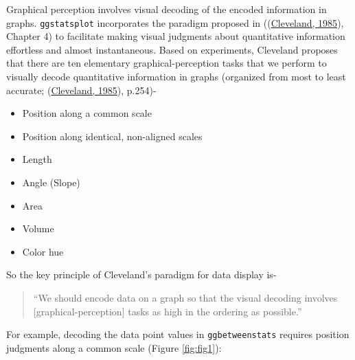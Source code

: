 \documentclass[
]{article}
\providecommand{\tightlist}{%
  \setlength{\itemsep}{0pt}\setlength{\parskip}{0pt}}
\begin{document}
Graphical perception involves visual decoding of the encoded information in
graphs. \texttt{ggstatsplot} incorporates the paradigm proposed in
((\protect\hyperlink{ref-clevelandElementsGraphingData1985}{Cleveland, 1985}), Chapter 4) to facilitate making visual
judgments about quantitative information effortless and almost instantaneous.
Based on experiments, Cleveland proposes that there are ten elementary
graphical-perception tasks that we perform to visually decode quantitative
information in graphs (organized from most to least accurate;
(\protect\hyperlink{ref-clevelandElementsGraphingData1985}{Cleveland, 1985}), p.254)-

\begin{itemize}
\tightlist
\item
  Position along a common scale
\item
  Position along identical, non-aligned scales
\item
  Length
\item
  Angle (Slope)
\item
  Area
\item
  Volume
\item
  Color hue
\end{itemize}

So the key principle of Cleveland's paradigm for data display is-

\begin{quote}
``We should encode data on a graph so that the visual decoding involves
{[}graphical-perception{]} tasks as high in the ordering as possible.''
\end{quote}

For example, decoding the data point values in \texttt{ggbetweenstats} requires
position judgments along a common scale (Figure \ref{fig:fig1}):
\end{document}
